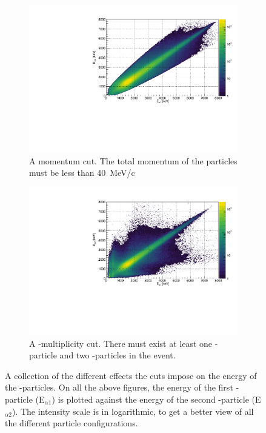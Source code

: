 \begin{figure}[H]
\begin{subfigure}[t]{0.49\linewidth}
		\includegraphics[width=\linewidth]{../figures/EEMomentumCut.pdf}
		\caption{A momentum cut. The total momentum of the particles must be less than \SI{40}{MeV/c}}
		\label{fig:EEMomentumCut}
	\end{subfigure}\hfill
	\begin{subfigure}[t]{0.49\linewidth}
		\includegraphics[width=\linewidth]{../figures/EEBetaMulCut.pdf}
		\caption{A \be-multiplicity cut. There must exist at least one \be-particle and two \al-particles in the event. }
		\label{fig:EEBetaMulCut}
	\end{subfigure}
	\caption{A collection of the different effects the cuts impose on the energy of the \al-particles. On all the above figures, the energy of the first \al-particle (E$_{\alpha1}$) is plotted against the energy of the second \al-particle (E$_{\alpha2}$). The intensity scale is in logarithmic, to get a better view of all the different particle configurations.}
\end{figure}

